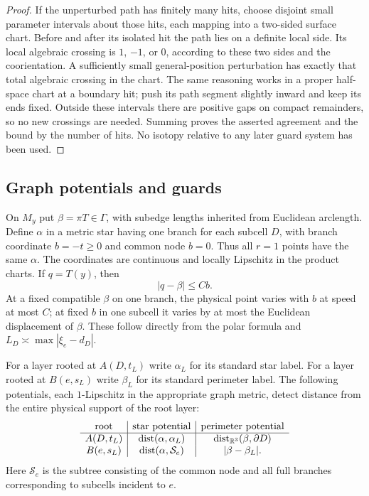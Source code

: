 \documentclass[11pt]{article}
\numberwithin{equation}{section}
\theoremstyle{definition}
\theoremstyle{remark}
\begin{document}
\begin{proof}
If the unperturbed path has finitely many hits, choose disjoint small
parameter intervals about those hits, each mapping into a two-sided surface
chart.  Before and after its isolated hit the path lies on a definite local
side.  Its local algebraic crossing is $1$, $-1$, or $0$, according to these
two sides and the coorientation.  A sufficiently small general-position
perturbation has exactly that total algebraic crossing in the chart.  The
same reasoning works in a proper half-space chart at a boundary hit; push
its path segment slightly inward and keep its ends fixed.  Outside these
intervals there are positive gaps on compact remainders, so no new crossings
are needed.  Summing proves the asserted agreement and the bound by the
number of hits.  No isotopy relative to any later guard system has been
used.
\end{proof}


\subsection{Graph potentials and guards}

On $M_y$ put $\beta=\pi T\in\Gamma$, with subedge lengths inherited
from Euclidean arclength.  Define $\alpha$ in a metric star having one
branch for each subcell $D$, with branch coordinate $b=-t\geq0$ and
common node $b=0$.  Thus all $r=1$ points have the same $\alpha$.
The coordinates are continuous and locally Lipschitz in the product
charts.  If $q=T(y)$, then
\begin{equation}\label{wl:graph-physical}
 |q-\beta|\leq Cb.
\end{equation}
At a fixed compatible $\beta$ on one branch, the physical point varies
with $b$ at speed at most $C$; at fixed $b$ in one subcell it varies by
at most the Euclidean displacement of $\beta$.  These follow directly
from the polar formula and $L_D\asymp\max|\xi_e-d_D|$.

For a layer rooted at $A(D,t_L)$ write $\alpha_L$ for its standard
star label.  For a layer rooted at $B(e,s_L)$ write $\beta_L$ for its
standard perimeter label.  The following potentials, each
$1$-Lipschitz in the appropriate graph metric, detect distance from
the entire physical support of the root layer:
\begin{equation}\label{wl:potentials}
\begin{array}{c|c|c}
 \hbox{root}&\hbox{star potential}&\hbox{perimeter potential}\\ \hline
 A(D,t_L)&\operatorname{dist}(\alpha,\alpha_L)&\operatorname{dist}_{\mathbb R^3}(\beta,\partial D)\\
 B(e,s_L)&\operatorname{dist}(\alpha,\mathcal S_e)&|\beta-\beta_L|.
\end{array}
\end{equation}
Here $\mathcal S_e$ is the subtree consisting of the common node and
all full branches corresponding to subcells incident to $e$.
\end{document}
